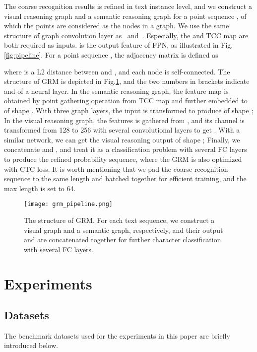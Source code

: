 \documentclass[letterpaper]{article} \usepackage{aaai21}  \usepackage{times}  \usepackage{helvet} \usepackage{courier}  \usepackage[hyphens]{url}  \usepackage{graphicx} \urlstyle{rm} \def\UrlFont{\rm}  \usepackage{natbib}  \usepackage{caption} \usepackage{bm}
\begin{document}
The coarse recognition results is refined in text instance level, and we construct a visual reasoning graph and a semantic reasoning graph for a point sequence , of which the points are considered as the nodes in a graph. We use the same structure of graph convolution layer as~\cite{wang2019gncclust} and~\cite{zhang2020det}. Especially, the  and TCC map are both required as inputs.  is the output feature of FPN, as illustrated in Fig.\ref{fig:pipeline}. For a point sequence , the adjacency matrix is defined as

where  is a L2 distance between  and , and each node is self-connected. 
The structure of GRM is depicted in Fig.\ref{fig:grm_pipeline}, and the two numbers in brackets indicate  and  of a neural layer. In the semantic reasoning graph, the feature map  is obtained by point gathering operation from TCC map and further embedded to  of shape . With three graph layers, the input  is transformed to produce  of shape ; In the visual reasoning graph, the features  is gathered from , and its channel is transformed from 128 to 256 with several convolutional layers to get . With a similar network, we can get the visual reasoning output  of shape ; Finally, we concatenate  and , and treat it as a classification problem with several FC layers to produce the refined probability sequence, where the GRM is also optimized with CTC loss. It is worth mentioning that we pad the coarse recognition sequence to the same length and batched together for efficient training, and the max length is set to 64. 

\begin{figure}
    \centering
    \texttt{[image: grm\_pipeline.png]}
    \caption{The structure of GRM. For each text sequence, we construct a visual graph and a semantic graph, respectively, and their output  and  are concatenated together for further character classification with several FC layers.}
    \label{fig:grm_pipeline}
\end{figure}



\section{Experiments}

\subsection{Datasets}
The benchmark datasets used for the experiments in this paper are briefly introduced below.
\end{document}
